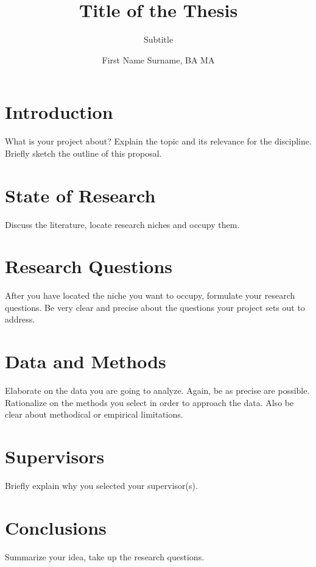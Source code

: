 \documentclass[naustrian,english]{univie-ling-expose}
\author{First Name Surname, BA MA}
\title{Title of the Thesis}
\subtitle{Subtitle}
\begin{document}
\maketitle

\tableofcontents

\section{Introduction}\label{sec:intro}

What is your project about? Explain the topic and its relevance for the discipline.
Briefly sketch the outline of this proposal.


\section{State of Research}\label{sec:state}

Discuss the literature, locate research niches and occupy them.


\section{Research Questions}\label{sec:questions}

After you have located the niche you want to occupy, formulate your research questions.
Be very clear and precise about the questions your project sets out to address.


\section{Data and Methods}\label{sec:data}

Elaborate on the data you are going to analyze. Again, be as precise are possible.
Rationalize on the methods you select in order to approach the data. Also be clear about methodical or empirical limitations.


\section{Supervisors}\label{sec:superv}

Briefly explain why you selected your supervisor(s).


\section{Conclusions}\label{sec:conclusions}

Summarize your idea, take up the research questions.
\end{document}
